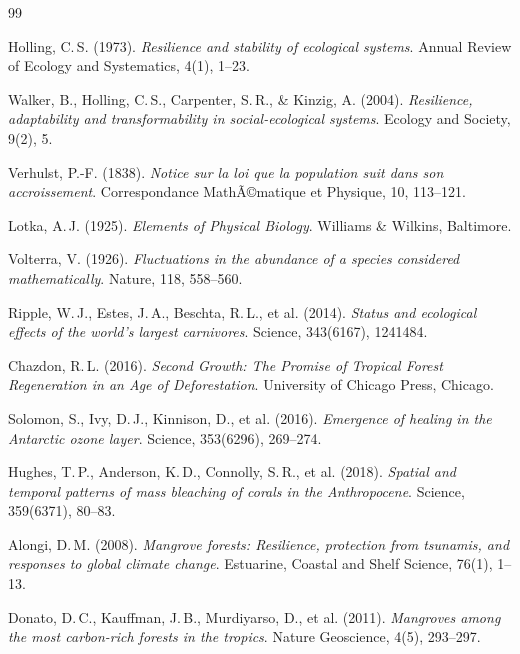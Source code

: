 ﻿\documentclass[a4paper,12pt]{article}
\theoremstyle{definition}
\begin{document}
\begin{thebibliography}{99}

Holling, C.\,S. (1973).
\textit{Resilience and stability of ecological systems}.
Annual Review of Ecology and Systematics, 4(1), 1--23.

Walker, B., Holling, C.\,S., Carpenter, S.\,R., \& Kinzig, A. (2004).
\textit{Resilience, adaptability and transformability in social-ecological systems}.
Ecology and Society, 9(2), 5.

Verhulst, P.-F. (1838).
\textit{Notice sur la loi que la population suit dans son accroissement}.
Correspondance MathÃ©matique et Physique, 10, 113--121.

Lotka, A.\,J. (1925).
\textit{Elements of Physical Biology}.
Williams \& Wilkins, Baltimore.

Volterra, V. (1926).
\textit{Fluctuations in the abundance of a species considered mathematically}.
Nature, 118, 558--560.

Ripple, W.\,J., Estes, J.\,A., Beschta, R.\,L., et al. (2014).
\textit{Status and ecological effects of the world's largest carnivores}.
Science, 343(6167), 1241484.

Chazdon, R.\,L. (2016).
\textit{Second Growth: The Promise of Tropical Forest Regeneration in an Age of Deforestation}.
University of Chicago Press, Chicago.

Solomon, S., Ivy, D.\,J., Kinnison, D., et al. (2016).
\textit{Emergence of healing in the Antarctic ozone layer}.
Science, 353(6296), 269--274.

Hughes, T.\,P., Anderson, K.\,D., Connolly, S.\,R., et al. (2018).
\textit{Spatial and temporal patterns of mass bleaching of corals in the Anthropocene}.
Science, 359(6371), 80--83.

Alongi, D.\,M. (2008).
\textit{Mangrove forests: Resilience, protection from tsunamis, and responses to global climate change}.
Estuarine, Coastal and Shelf Science, 76(1), 1--13.

Donato, D.\,C., Kauffman, J.\,B., Murdiyarso, D., et al. (2011).
\textit{Mangroves among the most carbon-rich forests in the tropics}.
Nature Geoscience, 4(5), 293--297.


\end{thebibliography}
\end{document}
